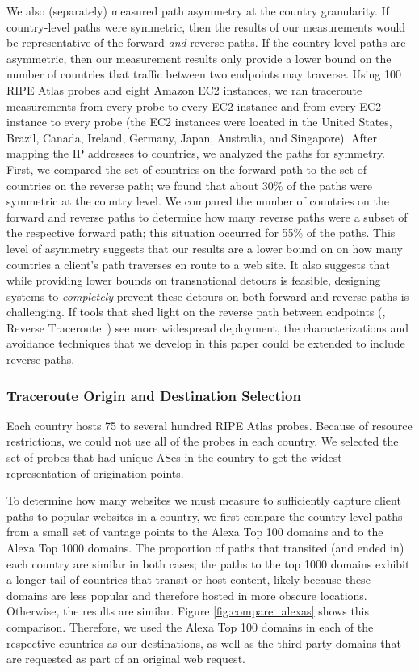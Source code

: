 We also (separately)
measured path asymmetry at the country granularity. If country-level paths
were symmetric, then the results of our measurements would be representative
of the forward {\it and} reverse paths. If the country-level paths are
asymmetric, then our measurement results only provide a lower bound on the
number of countries that traffic between two endpoints may traverse.  Using
100 RIPE Atlas probes and eight Amazon EC2 instances,
we ran traceroute measurements from every probe to every EC2 instance and from
every EC2 instance to every probe (the EC2 instances were located in the United States, Brazil, 
Canada, Ireland, Germany, Japan, Australia, and Singapore).  After mapping the IP addresses to countries, we
analyzed the paths for symmetry.  First, we compared the set of countries on
the forward path to the set of countries on the reverse path; we found that about 30\% of the 
paths were symmetric at the country level.  We compared the number of countries on the forward and
reverse paths to determine how many reverse paths were a subset of the
respective forward path; this situation occurred for 55\% of the paths. This
level of asymmetry suggests that our results are a lower bound on on how many countries a client’s 
path traverses en route to a web site. It also suggests that
while providing lower bounds on transnational detours is feasible, designing
systems to {\em completely} prevent these detours on both forward and reverse
paths is challenging. If tools that shed light on the reverse path
between endpoints (\eg, Reverse Traceroute~\cite{katz2010reverse}) see more widespread deployment,
the characterizations and avoidance techniques that we develop in this paper could
be extended to include reverse paths.

\subsubsection{Traceroute Origin and Destination Selection}

Each country hosts 75 to several hundred RIPE Atlas probes.  Because of resource
restrictions, we could not use all of the probes in each country.  We
selected the set of probes that had unique ASes in the country to get
the widest representation of origination points.

To determine how many websites we must measure to sufficiently capture client 
paths to popular websites in a country, we first compare the country-level paths from a small set of vantage 
points to the Alexa Top 100 domains 
 and to the Alexa Top 1000 domains.  The proportion of paths that transited (and
ended in) each country are similar in both cases; the paths to the top 1000
domains exhibit a longer tail of countries that transit or host content,
likely because these domains are less popular and therefore hosted in more
obscure locations. Otherwise, the results are similar. Figure \ref{fig:compare_alexas} 
shows this comparison.  Therefore, we used the Alexa Top 100 
domains in each of the respective countries as our destinations, as well as the third-party 
domains that are requested as part of an original web request. 

